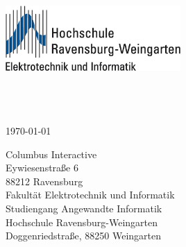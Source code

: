\begin{titlepage}
  \begin{center}

    \includegraphics[width=0.5\textwidth]{../deckblatt/images/logo.png}\\[2cm]    
    {\huge \bfseries \headline}\\[0.5cm]
    {\huge \bfseries \subheadline}\\[0.5cm]
    {\huge \bfseries \subsubheadline}\\[0.5cm]
    
    \begin{abstract}
      \noindent
       \\[1cm]
    \end{abstract}

    {\large \today}\\[1cm]
    \vspace{2cm}

	\begin{flushleft}
      \hspace*{3cm} Columbus Interactive\\
      \hspace*{3cm} Eywiesenstraße 6\\
      \hspace*{3cm} 88212 Ravensburg\\
      \vspace{1cm}
      \hspace*{3cm} Fakultät Elektrotechnik und Informatik\\
      \hspace*{3cm} Studiengang Angewandte Informatik\\
      \hspace*{3cm} Hochschule Ravensburg-Weingarten\\
      \hspace*{3cm} Doggenriedstraße, 88250 Weingarten

    \end{flushleft}

    \vspace{1.5cm}


\end{center}
\end{titlepage}
